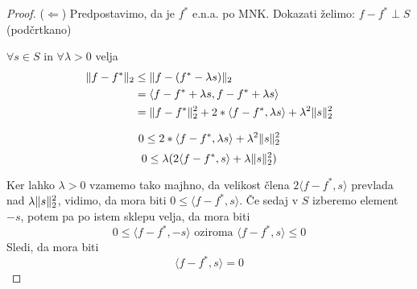 \documentclass[a4paper,12pt]{article}
\DeclarePairedDelimiter\norm{\lVert}{\rVert}
\newcommand{\innerproduct}[2]{\langle #1, #2 \rangle}
\theoremstyle{definition}
\theoremstyle{remark}
\begin{document}
\begin{proof}
    ($\Longleftarrow$)
    Predpostavimo, da je $f^*$ e.n.a. po MNK.
    Dokazati želimo: $f - f^* \perp S$ (podčrtkano)

    $\forall s \in S \text{ in } \forall \lambda > 0$ velja
    \begin{align}
        \norm{f - f^*}_2 &\leq \norm{f - (f^* - \lambda s)}_2\\
                         &= \innerproduct{f - f^* + \lambda s}{f - f^* + \lambda s}\\
                         &= \norm{f-f^*}_2^2 + 2 * \innerproduct{f - f^*}{\lambda s} + \lambda^2 \norm{s}_2^2
    \end{align}

    \[0 \leq 2 * \innerproduct{f - f^*}{\lambda s} + \lambda^2 \norm{s}_2^2\]
    \[0 \leq \lambda (2\innerproduct{f-f^*}{s} + \lambda \norm{s}_2^2)\]

    Ker lahko $\lambda > 0$ vzamemo tako majhno, da velikost člena $2\innerproduct{f-f^*}{s}$ prevlada nad $\lambda \norm{s}_2^2$, vidimo,
    da mora biti $0 \leq \innerproduct{f-f^*}{s}$. Če sedaj v $S$ izberemo element $-s$, potem pa po istem sklepu velja, da mora biti
    \begin{equation}
        0 \leq \innerproduct{f - f^*}{-s} \text{ oziroma } \innerproduct{f - f^*}{s} \leq 0
    \end{equation}
    Sledi, da mora biti
    \begin{equation}
        \innerproduct{f - f^*}{s} = 0
    \end{equation}
\end{proof}
\end{document}
